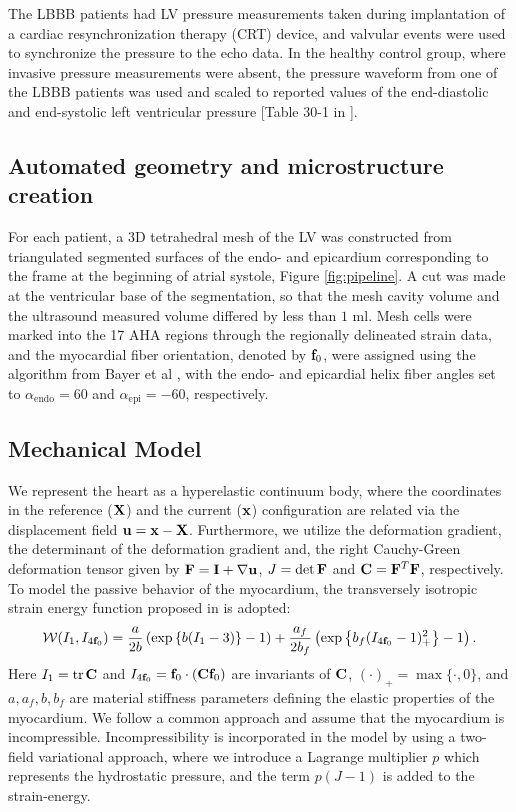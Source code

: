 The LBBB patients had LV pressure measurements taken during
implantation of a cardiac resynchronization therapy (CRT) device, and
valvular events were used to synchronize the pressure to the echo
data. In the healthy control group, where invasive pressure measurements were
absent, the pressure waveform from one of the LBBB patients was used and
scaled to reported values of the end-diastolic and end-systolic
left ventricular pressure [Table 30-1 in \cite{klingensmith2008washington}].


\subsection{Automated geometry and microstructure creation}
For each patient, a 3D tetrahedral mesh of the LV was
constructed from triangulated segmented surfaces of the endo- and
epicardium corresponding to the frame at the beginning of
atrial systole, Figure \ref{fig:pipeline}. A cut was made at the
ventricular base of the segmentation, so that the mesh cavity volume
and the ultrasound measured volume differed by less than  $1$ ml. Mesh
cells were marked into the 17 AHA regions through the regionally
delineated strain data, and the myocardial fiber orientation, denoted
by $\mathbf{f}_0$, were assigned using the algorithm from Bayer et al \cite{bayer2012novel},
with the endo- and epicardial helix fiber angles set to
$\alpha_{\text{endo}} = 60$ and $\alpha_{\text{epi}} = -60$, respectively.

\subsection{Mechanical Model}
We represent the heart as a hyperelastic continuum body, where the coordinates in
the reference ($\mathbf{X}$) and the current ($\mathbf{x}$) configuration are
related via the displacement field $\mathbf{u} = \mathbf{x}-\mathbf{X}$. Furthermore,
we utilize the
deformation gradient, the determinant of the deformation gradient
and, the right Cauchy-Green deformation tensor given by $\mathbf{F}= \mathbf{I}+\nabla
\mathbf{u} $,  $J = \det \mathbf{F}$ and $\mathbf{C} = \mathbf{F}^T\mathbf{F}$, respectively. 
To model the passive behavior of the myocardium, the transversely 
isotropic strain energy function proposed in  \cite{holzapfel2009constitutive} is adopted:
\begin{align}
\label{eq:hoa}
  \mathcal{W}(I_1, I_{4\mathbf{f}_0}) = \frac{a}{2 b} \left( \exp\left\{ b (I_1 
  - 3)\right\}  -1 \right)
  + \frac{a_f}{2 b_f} \left( \exp\left\{ b_f (I_{4\mathbf{f}_0} 
  - 1)_+^2\right\} -1 \right).
\end{align}
Here $I_1 = \mathrm{tr} \hspace{0.05cm} \mathbf{C}$ and $I_{4\mathbf{f}_0}= \mathbf{f}_0 \cdot (\mathbf{C} \mathbf{f}_0)$ are invariants
of $\mathbf{C}$, $(\cdotp)_{+}  = \max\{\cdot, 0\}$, and $a, a_f, b, b_f$ are
material stiffness parameters defining the elastic properties of the myocardium.
We follow a common approach and assume that the myocardium is incompressible. 
Incompressibility is incorporated in the model by using a two-field variational 
approach, where we introduce a Lagrange multiplier $p$ which represents the 
hydrostatic pressure, and the term $p(J-1)$ is added to the strain-energy.

